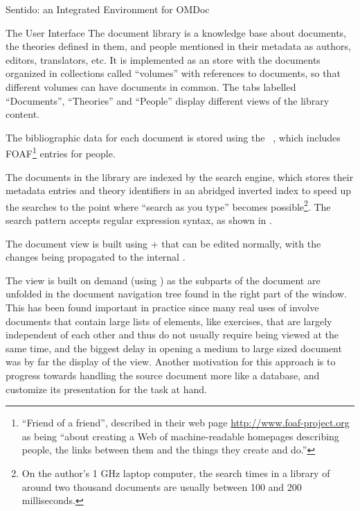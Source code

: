 \begin{omgroup}[id=sentido,short=Sentido Integrated Environment,
            creators=alberto]{Sentido: an Integrated Environment for OMDoc}
\begin{omgroup}{The User Interface}
The document library is a knowledge base about documents,
the theories defined in them,
and people mentioned in their metadata as authors, editors, translators, etc.
It is implemented as an {\rdf} store with the documents organized in
collections called ``volumes'' with references to documents,
so that different volumes can have documents in common.
The tabs labelled ``Documents'', ``Theories'' and ``People'' display
different views of the library content.

The bibliographic data for each document
is stored using the {}~\cite{Lennox04},
which includes
FOAF\footnote{``Friend of a friend'', described in their web page
  \url{http://www.foaf-project.org} as being
``about creating a Web of machine-readable homepages describing people,
  the links between them and the things they create and do.''}
entries for people.

The documents in the library are indexed by the search engine,
which stores their metadata entries and theory identifiers
in an abridged inverted index to speed up the searches
to the point where ``search as you type'' becomes possible\footnote{On the
  author's 1 GHz laptop computer, the search times in a library of around two thousand
  documents are usually between 100 and 200 milliseconds.}.
The search pattern accepts regular expression syntax, as shown in {}.

\begin{myfig}{screenshot3}{Metadata Search in {\sentido}: tooltips show the content of the cropped entries.}
  \texttt{[image: \\projectsPath\{sentido/sentido\_metadata\_search\_tooltip\_detail]}}
\end{myfig}

The document view is built using
{\xhtml} + {\mathml} that can be edited normally,
with the changes being propagated to the internal {\omdoc}.

The view is built on demand (using {\xslt}) as the subparts of the
document are unfolded
in the document navigation tree found in the right part of the window.
This has
been found important in practice since many real uses of {\omdoc} involve
documents that contain large lists of elements, like exercises, that are
largely independent of each other and thus do not usually require being
viewed at the same time, and the biggest delay in opening a medium to
large sized document was by far the display of the {\xhtml} view.
Another motivation for this approach is to progress towards handling the
source document more like a database, and customize its presentation
for the task at hand.


\end{omgroup}
\end{omgroup}
